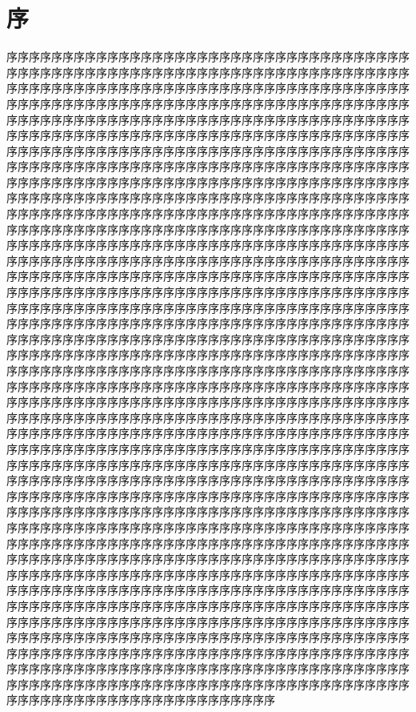 \chapter*{序}



序序序序序序序序序序序序序序序序序序序序序序序序序序序序序序序序序序序序序序序序序序序序序序序序序序序序序序序序序序序序序序序序序序序序序序序序序序序序序序序序序序序序序序序序序序序序序序序序序序序序序序序序序序序序序序序序序序序序序序序序序序序序序序序序序序序序序序序序序序序序序序序序序序序序序序序序序序序序序序序序序序序序序序序序序序序序序序序序序序序序序序序序序序序序序序序序序序序序序序序序序序序序序序序序序序序序序序序序序序序序序序序序序序序序序序序序序序序序序序序序序序序序序序序序序序序序序序序序序序序序序序序序序序序序序序序序序序序序序序序序序序序序序序序序序序序序序序序序序序序序序序序序序序序序序序序序序序序序序序序序序序序序序序序序序序序序序序序序序序序序序序序序序序序序序序序序序序序序序序序序序序序序序序序序序序序序序序序序序序序序序序序序序序序序序序序序序序序序序序序序序序序序序序序序序序序序序序序序序序序序序序序序序序序序序序序序序序序序序序序序序序序序序序序序序序序序序序序序序序序序序序序序序序序序序序序序序序序序序序序序序序序序序序序序序序序序序序序序序序序序序序序序序序序序序序序序序序序序序序序序序序序序序序序序序序序序序序序序序序序序序序序序序序序序序序序序序序序序序序序序序序序序序序序序序序序序序序序序序序序序序序序序序序序序序序序序序序序序序序序序序序序序序序序序序序序序序序序序序序序序序序序序序序序序序序序序序序序序序序序序序序序序序序序序序序序序序序序序序序序序序序序序序序序序序序序序序序序序序序序序序序序序序序序序序序序序序序序序序序序序序序序序序序序序序序序序序序序序序序序序序序序序序序序序序序序序序序序序序序序序序序序序序序序序序序序序序序序序序序序序序序序序序序序序序序序序序序序序序序序序序序序序序序序序序序序序序序序序序序序序序序序序序序序序序序序序序序序序序序序序序序序序序序序序序序序序序序序序序序序序序序序序序序序序序序序序序序序序序序序序序序序序序序序序序序序序序序序序序序序序序序序序序序序序序序序序序序序序序序序序序序序序序序序序序序序序序序序序序序序序序序序序序序序序序序序序序序序序序序序序序序序序序序序序序序序序序序序序序序序序序序序序序序序序序序序序序序序序序序序序序序序序序序序序序序序序序序序序序序序序序序序序序序序序序序序序序序序序序序序序序序序序序序序序序序序序序序序序序序序序序序序序序序序序序序序序序序序序序序序序序序序序序序序序序序序序序序序序序序序序序序序序序序序序序序序序序序序序序序序序序序序序序序序序序序序序序序序序序序序序序序序序序序序序序序序序序序序序序序序序序序序序序序序序序序序序序序序序序序序序序序序序序序序序序序序序序序序序序序序序序序序序序序序序序序序序序序序序序序序序序序序序序序序序序序序序序序序序序序序序序序序序序序序序序序序序序序序序序序序序序序序序序序序序序序序序序序序序序序序序序序序序序序序序序序序序序序序序序序序序序序序序序序序序序序序序序序序序序序序序序序序序序序序序序序序序序序序序序序序序序序序序序序序序序序序序序序序序序序序序序序序序序序序序序序序序序序序序序序序序序序序序序序序序序序序序序序序序序序序序序序序序序序序序序序序序序序序序序序序序序序序序序序序序序序序序序序序序序序序序序序序序序序序序序序序序序序序序序序序序序序序序序序序序序序序序序序序序序序序序序序序序序序序序序序序序序序序序序序序序序序序序序序序序序序序序序序序序序序序序